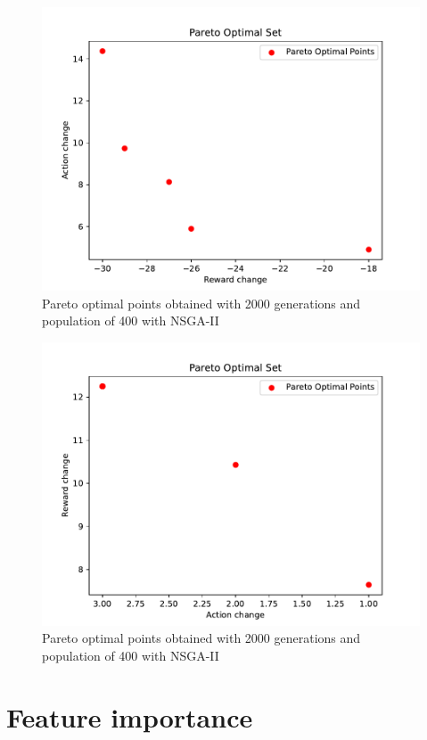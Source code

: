 \documentclass[UKenglish]{uiomasterthesis}
\begin{document}
\begin{figure}[!ht]
	\includegraphics[width=\columnwidth]{images/best_counterfactuals.pdf}
	\caption{Pareto optimal points obtained with 2000 generations and population of 400 with NSGA-II}
	\label{fig:pareto} 
\end{figure}

\begin{figure}[!ht]
	\includegraphics[width=\columnwidth]{images/best_counterfactuals_with_model.pdf}
	\caption{Pareto optimal points obtained with 2000 generations and population of 400 with NSGA-II}
	\label{fig:pareto_model} 
\end{figure}

\section{Feature importance}
\end{document}
